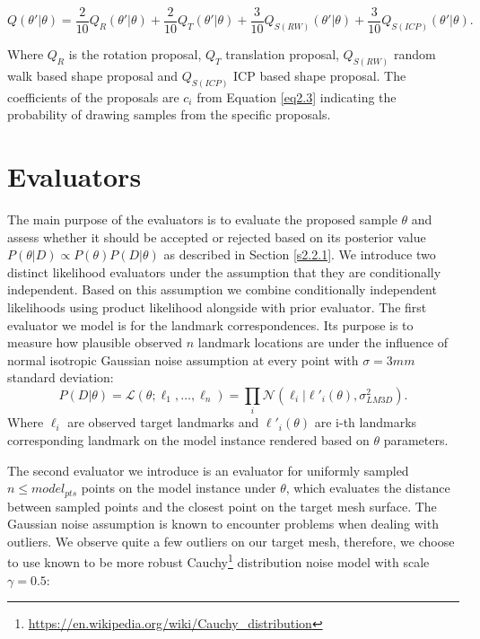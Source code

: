 \begin{equation}
  Q(\theta' | \theta) = \frac{2}{10}Q_R(\theta' | \theta) + \frac{2}{10}Q_T(\theta' | \theta) + \frac{3}{10}Q_{S(RW)}(\theta' | \theta) + \frac{3}{10} Q_{S(ICP)}(\theta' | \theta).
\end{equation}

Where $Q_R$ is the rotation proposal, $Q_T$ translation proposal, $Q_{S(RW)}$ random walk based shape proposal and $Q_{S(ICP)}$ ICP based shape proposal. The coefficients of the proposals are $c_i$ from Equation \ref{eq2.3} indicating the probability of drawing samples from the specific proposals. 

\section*{Evaluators}
The main purpose of the evaluators is to evaluate the proposed sample $\theta$ and assess whether it should be accepted or rejected based on its posterior value $P(\theta | D) \propto P(\theta) P(D | \theta)$ as described in Section \ref{s2.2.1}. We introduce two distinct likelihood evaluators under the assumption that they are conditionally independent. Based on this assumption we combine conditionally independent likelihoods using product likelihood alongside with prior evaluator. The first evaluator we model is for the landmark correspondences. Its purpose is to measure how plausible observed $n$ landmark locations are under the influence of normal isotropic Gaussian noise assumption at every point with $\sigma = 3mm$ standard deviation:
\begin{equation}
    P(D|\theta) = \mathcal L(\theta; \ell_1, \dots, \ell_n) = \prod_{i}\mathcal N(\ell_i|\ell'_i(\theta), \sigma^2_{LM3D}).
    \label{eq3.1}
\end{equation}  
Where $\ell_i$ are observed target landmarks and $\ell'_i(\theta)$ are i-th landmarks corresponding landmark on the model instance rendered based on $\theta$ parameters. \bigskip

The second evaluator we introduce is an evaluator for uniformly sampled $n \leq model_{pts}$ points on the model instance under $\theta$, which evaluates the distance between sampled points and the closest point on the target mesh surface. The Gaussian noise assumption is known to encounter problems when dealing with outliers. We observe quite a few outliers on our target mesh, therefore, we choose to use known to be more robust Cauchy\footnote{\url{https://en.wikipedia.org/wiki/Cauchy_distribution}} distribution\cite{Schoenborn2014} noise model with scale $\gamma = 0.5$:    

